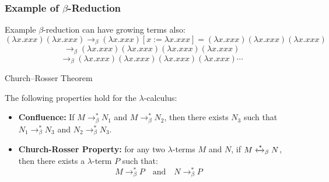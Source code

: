 \documentclass{beamer}
\begin{document}
\begin{frame}
  \frametitle{Example of $\beta$-Reduction}

  \begin{block}{Example}
    \(\beta\)-reduction can have growing terms also:
    \[
      (\lambda x.xxx)(\lambda x.xxx) \rightarrow_\beta (\lambda x.xxx)[x := \lambda x.xxx] = (\lambda x.xxx)(\lambda x.xxx)(\lambda x.xxx)
    \]
    \[
      \rightarrow_\beta (\lambda x.xxx)(\lambda x.xxx)(\lambda x.xxx)(\lambda x.xxx)
    \]
    \[
      \rightarrow_\beta (\lambda x.xxx)(\lambda x.xxx)(\lambda x.xxx)(\lambda x.xxx)\cdots
    \]
  \end{block}
\end{frame}

\begin{frame}{Church–Rosser Theorem}

  \begin{theorem}
    The following properties hold for the \(\lambda\)-calculus:
    \begin{itemize}
      \item \textbf{Confluence:} If \( M \rightarrow^*_\beta N_1 \) and \( M \rightarrow^*_\beta N_2 \), then there exists \( N_3 \) such that \( N_1 \rightarrow^*_\beta N_3 \) and \( N_2 \rightarrow^*_\beta N_3 \).
      
      \item \textbf{Church-Rosser Property:}
        for any two $\lambda$-terms \(M\) and \(N\), if \(M \xleftrightarrow{*}_\beta N\), then there exists a $\lambda$-term \(P\) such that:
        \[
          M \rightarrow^{*}_\beta P \quad \text{and} \quad N \rightarrow^{*}_\beta P
        \]
    \end{itemize}
  \end{theorem}
\end{frame}
\end{document}
